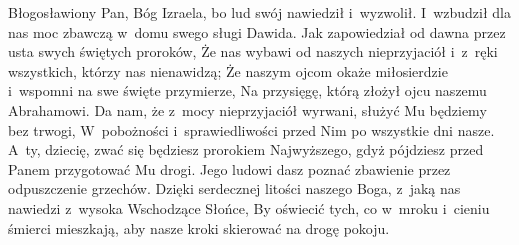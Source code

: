 \startpsalmus[title={Pieśń Zachariasza (Łk 1,68-79)}]
Błogosławiony Pan, Bóg Izraela,\pmed
bo lud swój nawiedził i~wyzwolił.\pfin
I~wzbudził dla nas moc zbawczą\pmed
w~domu swego sługi Dawida.\pfin
Jak zapowiedział od dawna\pmed
przez usta swych świętych proroków,\pfin
Że nas wybawi od naszych nieprzyjaciół\pmed
i~z~ręki wszystkich, którzy nas nienawidzą;\pfin
Że naszym ojcom okaże miłosierdzie\pmed
i~wspomni na swe święte przymierze,\pfin
Na przysięgę, którą złożył\pmed
ojcu naszemu Abrahamowi.\pfin
Da nam, że z~mocy nieprzyjaciół wyrwani,\pmed
służyć Mu będziemy bez trwogi,\pfin
W~pobożności i~sprawiedliwości przed Nim\pmed
po wszystkie dni nasze.\pfin
A~ty, dziecię, zwać się będziesz prorokiem Najwyższego,\pmed
gdyż pójdziesz przed Panem przygotować Mu drogi.\pfin
Jego ludowi dasz poznać zbawienie\pmed
przez odpuszczenie grzechów.\pfin
Dzięki serdecznej litości naszego Boga,\pmed
z~jaką nas nawiedzi z~wysoka Wschodzące Słońce,\pfin
By oświecić tych, co w~mroku i~cieniu śmierci mieszkają,\pmed
aby nasze kroki skierować na drogę pokoju.\pfin
\stoppsalmus
\endinput

